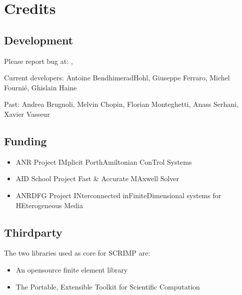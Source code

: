\documentclass[letterpaper,10pt,english]{sphinxmanual}
\begin{document}
\chapter{Credits}
\label{\detokenize{index:credits}}

\section{Development}
\label{\detokenize{index:development}}
\sphinxAtStartPar
Please report bug at: , 

\sphinxAtStartPar
Current developers: Antoine Bendhimerad\sphinxhyphen{}Hohl, Giuseppe Ferraro, Michel Fournié, Ghislain Haine

\sphinxAtStartPar
Past: Andrea Brugnoli, Melvin Chopin, Florian Monteghetti, Anass Serhani, Xavier Vasseur

\sphinxAtStartPar
{} 


\section{Funding}
\label{\detokenize{index:funding}}\begin{itemize}
\item {} 
\sphinxAtStartPar
ANR Project  \textendash{} IMplicit Port\sphinxhyphen{}hAmiltonian ConTrol Systems

\item {} 
\sphinxAtStartPar
AID School Project  \textendash{} Fast \& Accurate MAxwell Solver

\item {} 
\sphinxAtStartPar
ANR\sphinxhyphen{}DFG Project  \textendash{} INterconnected inFinite\sphinxhyphen{}Dimensional systems for HEterogeneous Media

\end{itemize}


\section{Third\sphinxhyphen{}party}
\label{\detokenize{index:third-party}}
\sphinxAtStartPar
The two  libraries used as core for SCRIMP are:
\begin{itemize}
\item {} 
\sphinxAtStartPar
{} \textendash{} An open\sphinxhyphen{}source finite element library

\item {} 
\sphinxAtStartPar
{} \textendash{} The Portable, Extensible Toolkit for Scientific Computation

\end{itemize}
\end{document}

